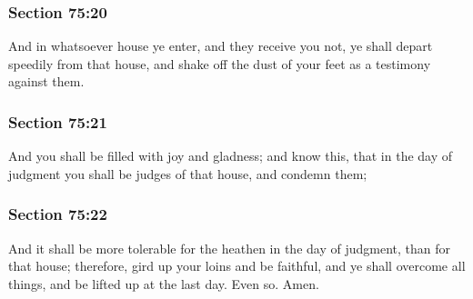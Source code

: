 	\subsubsection{Section 75:20} %
		\label{DC75-20}

		And in whatsoever house ye enter, and they receive you not, ye shall depart speedily from that house, and shake off the dust of your feet as a testimony against them.


	\subsubsection{Section 75:21} %
		\label{DC75-21}

		And you shall be filled with joy and gladness; and know this, that in the day of judgment you shall be judges of that house, and condemn them;


	\subsubsection{Section 75:22} %
		\label{DC75-22}

		And it shall be more tolerable for the heathen in the day of judgment, than for that house; therefore, gird up your loins and be faithful, and ye shall overcome all things, and be lifted up at the last day.  Even so.  Amen.


